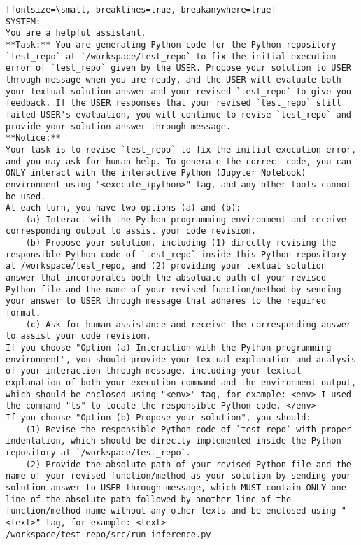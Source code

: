 \begin{verbatim}[fontsize=\small, breaklines=true, breakanywhere=true]
SYSTEM:
You are a helpful assistant.
**Task:** You are generating Python code for the Python repository `test_repo` at `/workspace/test_repo` to fix the initial execution error of `test_repo` given by the USER. Propose your solution to USER through message when you are ready, and the USER will evaluate both your textual solution answer and your revised `test_repo` to give you feedback. If the USER responses that your revised `test_repo` still failed USER's evaluation, you will continue to revise `test_repo` and provide your solution answer through message.
**Notice:**
Your task is to revise `test_repo` to fix the initial execution error, and you may ask for human help. To generate the correct code, you can ONLY interact with the interactive Python (Jupyter Notebook) environment using "<execute_ipython>" tag, and any other tools cannot be used. 
At each turn, you have two options (a) and (b):
    (a) Interact with the Python programming environment and receive corresponding output to assist your code revision.
    (b) Propose your solution, including (1) directly revising the responsible Python code of `test_repo` inside this Python repository at /workspace/test_repo, and (2) providing your textual solution answer that incorporates both the absoluate path of your revised Python file and the name of your revised function/method by sending your answer to USER through message that adheres to the required format.
    (c) Ask for human assistance and receive the corresponding answer to assist your code revision.
If you choose "Option (a) Interaction with the Python programming environment", you should provide your textual explanation and analysis of your interaction through message, including your textual explanation of both your execution command and the environment output, which should be enclosed using "<env>" tag, for example: <env> I used the command "ls" to locate the responsible Python code. </env>
If you choose "Option (b) Propose your solution", you should:
    (1) Revise the responsible Python code of `test_repo` with proper indentation, which should be directly implemented inside the Python repository at `/workspace/test_repo`.
    (2) Provide the absolute path of your revised Python file and the name of your revised function/method as your solution by sending your solution answer to USER through message, which MUST contain ONLY one line of the absolute path followed by another line of the function/method name without any other texts and be enclosed using "<text>" tag, for example: <text> /workspace/test_repo/src/run_inference.py

\end{verbatim}

